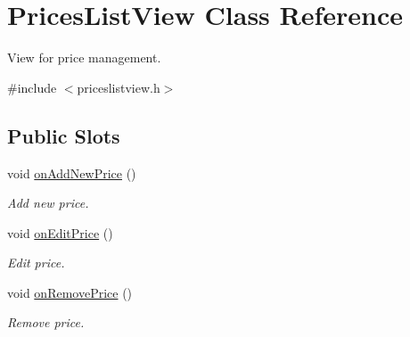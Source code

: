 \hypertarget{class_prices_list_view}{\section{\-Prices\-List\-View \-Class \-Reference}
\label{class_prices_list_view}
}


\-View for price management.  




{\ttfamily \#include $<$priceslistview.\-h$>$}

\subsection*{\-Public \-Slots}
\begin{DoxyCompactItemize}
\item 
void \hyperlink{class_prices_list_view_ad94c0fcac988da61ee512c2734448d43}{on\-Add\-New\-Price} ()
\begin{DoxyCompactList}\small\item\em \-Add new price. \end{DoxyCompactList}\item 
void \hyperlink{class_prices_list_view_abc32c5ea3c9df1eee2ce3fed362bbff4}{on\-Edit\-Price} ()
\begin{DoxyCompactList}\small\item\em \-Edit price. \end{DoxyCompactList}\item 
void \hyperlink{class_prices_list_view_ae41c648df8e9adfa51204b81b33031d1}{on\-Remove\-Price} ()
\begin{DoxyCompactList}\small\item\em \-Remove price. \end{DoxyCompactList}\end{DoxyCompactItemize}
